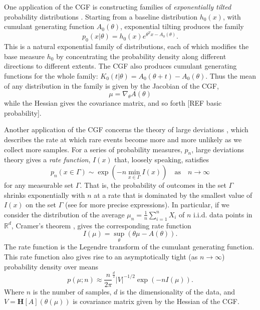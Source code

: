\documentclass[10pt]{article}      %
\begin{document}
One application of the CGF is constructing families of \textit{exponentially tilted} probability distributions \cite{morris_natural_1982,morris_unifying_2009}.
Starting from a baseline distribution $h_0(x)$, with cumulant generating function $A_0(\theta)$, exponential tilting produces the family
\begin{equation}
  p_0(x | \theta) = h_0(x) e^{\theta^T x - A_0(\theta)}. \label{def:exponential_tilt}
\end{equation}
This is a natural exponential family of distributions, each of which modifies the base measure $h_0$ by concentrating the probability density along different directions to different extents.
The CGF also produces cumulant generating functions for the whole family: ${K_0(t | \theta) = A_0(\theta + t) - A_0(\theta)}$.
Thus the mean of any distribution in the family is given by the Jacobian of the CGF,
\begin{equation}
  \mu = \nabla_\theta A(\theta) \label{eq:cgf_jacobian}
\end{equation}
while the Hessian gives the covariance matrix, and so forth [REF basic probability].


Another application of the CGF concerns the theory of large deviations \cite{dembo2009large,touchette_basic_2012}, which describes the rate at which rare events become more and more unlikely as we collect more samples. 
For a series of probability measures, $p_n$, large deviations theory gives a \textit{rate function}, $I(x)$ that, loosely speaking, satisfies
\begin{equation}
  p_n(x \in \Gamma) \sim \exp \left( - n \min_{x \in \Gamma} I(x) \right) \quad \textrm{as} \quad n \to \infty \label{def:large_deviations}
\end{equation}
for any measurable set $\Gamma$.
That is, the probability of outcomes in the set $\Gamma$ shrinks exponentially with $n$ at a rate that is dominated by the smallest value of $I(x)$ on the set $\Gamma$ (see \cite{dembo2009large} for more precise expressions).
In particular, if we consider the distribution of the average $\mu_n = \frac{1}{n} \sum_{i=1}^n X_i$ of $n$ i.i.d. data points in $\mathbb{R}^d$, Cramer's theorem \cite{dembo2009large}, gives the corresponding rate function
\begin{equation}
  I(\mu) = \sup_{\theta}( \theta \mu - A(\theta) ). \label{eq:legendre_transform}
\end{equation}
The rate function is the Legendre transform of the cumulant generating function.
This rate function also gives rise to an asymptotically tight (as $n \to \infty$) probability density over means \cite{iltis_sharp_1995,chaganty_multidimensional_1986}
\begin{equation}
  p(\mu; n) \approx \frac{n}{2\pi}^{\frac{d}{2}} |V|^{-1/2} \exp(-n I(\mu)). \label{def:mean_density}
\end{equation}
Where $n$ is the number of samples, $d$ is the dimensionality of the data, and $V = {\bm H}[A](\theta(\mu))$ is covariance matrix given by the Hessian of the CGF.
\end{document}
